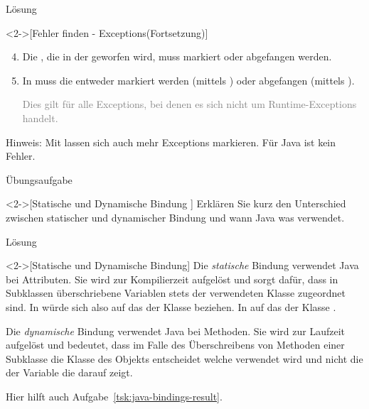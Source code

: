 \begin{frame}[c]{Lösung}
    \addtocounter{solve}{-1}
    \begin{solve}<2->[Fehler finden - Exceptions\hfill(Fortsetzung)]
        \begin{enumerate}[<+(1)->]
            \setcounter{enumi}{3}
            \item Die , die in der  geworfen wird, muss markiert oder abgefangen werden.
            \item In  muss die  entweder markiert werden (mittels ) oder abgefangen (mittels ).\pause\par \textcolor{gray}{Dies gilt für alle Exceptions, bei denen es sich nicht um Runtime-Exceptions handelt.}
        \end{enumerate}
        Hinweis: Mit  lassen sich auch mehr Exceptions markieren. Für Java ist  kein Fehler.
    \end{solve}
\end{frame}

\begin{frame}[c]{Übungsaufgabe}
    \begin{exercise}<2->[Statische und Dynamische Bindung ]
        Erklären Sie kurz den Unterschied zwischen statischer und dynamischer Bindung und wann Java was verwendet.
    \end{exercise}
\end{frame}

\begin{frame}[c]{Lösung}
    \begin{solve}<2->[Statische und Dynamische Bindung]
        Die \emph{statische} Bindung verwendet Java bei Attributen. Sie wird zur Kompilierzeit aufgelöst und sorgt dafür, dass in Subklassen überschriebene Variablen stets der verwendeten Klasse zugeordnet sind. In  würde sich  also auf das  der Klasse  beziehen. In  auf das der Klasse .\medskip\par
        \pause{}Die \emph{dynamische} Bindung verwendet Java bei Methoden. Sie wird zur Laufzeit aufgelöst und bedeutet, dass im Falle des Überschreibens von Methoden einer Subklasse die Klasse des Objekts entscheidet welche verwendet wird und nicht die der Variable die darauf zeigt.\pause\medskip\par
        Hier hilft auch Aufgabe~\ref{tsk:java-bindings-result}.
    \end{solve}
\end{frame}

